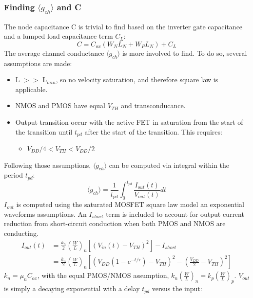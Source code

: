 		\subsubsection{Finding $\langle g_{ch}\rangle$ and C}
			The node capacitance C is trivial to find based on the inverter gate capacitance and a lumped load capacitance term $C_L$:
			\begin{equation}
				C = C_{ox}\left ( W_N L_N + W_P L_N \right) + C_L
			\end{equation}
			The average channel conductance $\langle g_{ch} \rangle$ is more involved to find. To do so, several assumptions are made:
			\begin{itemize}
				\item L $>>$ L$_{min}$, so no velocity saturation, and therefore square law is applicable.
				\item NMOS and PMOS have equal $V_{TH}$ and transconducance.
				\item Output transition occur with the active FET in saturation from the start of the transition until $t_{pd}$ after the start of the transition. This requires:
				\begin{itemize}
					\item $V_{DD}/4 < V_{TH} < V_{DD}/2$
				\end{itemize}
			\end{itemize}
			Following those assumptions, $\langle g_{ch} \rangle$ can be computed via integral within the period $t_{pd}$:
			\begin{equation}
				\langle g_{ch} \rangle = \frac{1}{t_{pd}} \int_0^{t_{pd}}\frac{I_{out}(t)}{V_{out}(t)}dt
			\end{equation}
			$I_{out}$ is computed using the saturated MOSFET square law model an exponential waveforms assumptions. An $I_{short}$ term is included to account for output current reduction from short-circuit conduction when both PMOS and NMOS are conducting.
			\begin{align}
				I_{out}(t) &= \frac{k_n}{2}\left(\frac{W}{L}\right)_n\left[\left(V_{in}(t) - V_{TH}\right)^2 \right]  - I_{short} \\
				&= \frac{k_n}{2}\left(\frac{W}{L}\right)_n \left[\left(V_{DD}\left(1-e^{-t/\tau}\right) - V_{TH}\right)^2 - \left(\frac{V_{DD}}{2} -V_{TH}\right)^2\right]
			\end{align}
			$k_n = \mu_nC_{ox}$, with the equal PMOS/NMOS assumption, $k_n\left(\frac{W}{L}\right)_n=k_p\left(\frac{W}{L}\right)_p$. $V_{out}$ is simply a decaying exponential with a delay $t_{pd}$ versus the input:
